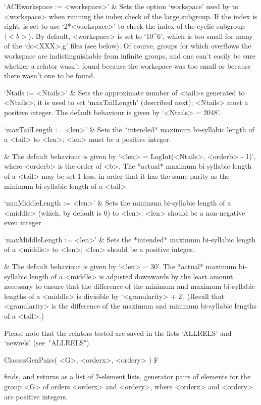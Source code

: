 \quad`ACEworkspace := <workspace>' & 
Sets the option `workspace' used by {\ACE} to <workspace> when running
the index check of the large subgroup. If the index is  right,  {\ACE}
is set to use  `2*<workspace>'  to  check  the  index  of  the  cyclic
subgroup $\langle <b> \rangle$. By  default,  <workspace>  is  set  to
`10^6', which is too small for many  of  the  `do<XXX>.g'  files  (see
below). Of course, groups for which {\ACE} overflows the workspace are
indistinguishable from infinite groups, and one can't easily  be  sure
whether a relator wasn't found because the workspace was too small  or
because there wasn't one to be found.

\quad`Ntails := <Ntails>' & 
Sets the approximate number of <tail>s generated to  <Ntails>;  it  is
used to set `maxTailLength' (described next); <Ntails> must a positive
integer. The default behaviour is given by `<Ntails> = 2048'.

\quad`maxTailLength := <len>' & 
Sets the *intended* maximum bi-syllabic length of a <tail>  to  <len>;
<len> must be a positive integer.

&
The default behaviour is given by `<len> = LogInt(<Ntails>, <orderb> -
1)', where  <orderb>  is  the  order  of  <b>.  The  *actual*  maximum
bi-syllabic length of a <tail> may be set 1 less, in order that it has
the same parity as the minimum bi-syllabic length of a <tail>.

\quad`minMiddleLength := <len>' & 
Sets the minimum bi-syllabic length of a <middle> (which,  by  default
is 0) to <len>; <len> should be a non-negative even integer.

\quad`maxMiddleLength := <len>' & 
Sets the *intended* maximum bi-syllabic length of a <middle> to <len>;
<len> should be a positive integer.

&
The default behaviour is given by `<len> = 30'. The  *actual*  maximum
bi-syllabic length of a <middle> is adjusted downwards  by  the  least
amount necessary to ensure that the  difference  of  the  minimum  and
maximum  bi-syllabic lengths  of   a   <middle>   is   divisible   by
`<granularity> + 2'. (Recall that <granularity> is the  difference  of
the maximum and minimum bi-syllabic lengths of a <tail>.)

\enditems

Please note that the relators tested are saved in the lists  `ALLRELS'
and `newrels' (see~"ALLRELS").

\>ClassesGenPairs( <G>, <orderx>, <ordery> ) F

finds, and returns as a list of 2-element lists,  generator  pairs  of
elements for the group <G> of  orders  <orderx>  and  <ordery>,  where
<orderx> and <ordery> are positive integers.

